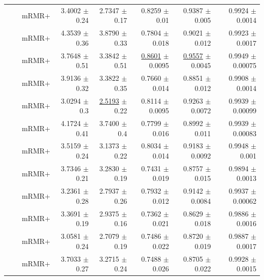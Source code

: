 \begin{longtable}{llp{}rrrrr}
 &  & mRMR+ & 3.4002 {\scriptsize $\pm$ 0.24} & 2.7347 {\scriptsize $\pm$ 0.17} & 0.8259 {\scriptsize $\pm$ 0.01} & 0.9387 {\scriptsize $\pm$ 0.005} & 0.9924 {\scriptsize $\pm$ 0.0014} \\
 &  & mRMR+ & 4.3539 {\scriptsize $\pm$ 0.36} & 3.8790 {\scriptsize $\pm$ 0.33} & 0.7804 {\scriptsize $\pm$ 0.018} & 0.9021 {\scriptsize $\pm$ 0.012} & 0.9923 {\scriptsize $\pm$ 0.0017} \\
 &  & mRMR+ & 3.7648 {\scriptsize $\pm$ 0.51} & 3.3842 {\scriptsize $\pm$ 0.51} & \underline{0.8601} {\scriptsize $\pm$ 0.0095} & \underline{0.9557} {\scriptsize $\pm$ 0.0045} & 0.9949 {\scriptsize $\pm$ 0.00075} \\
 &  & mRMR+ & 3.9136 {\scriptsize $\pm$ 0.32} & 3.3822 {\scriptsize $\pm$ 0.35} & 0.7660 {\scriptsize $\pm$ 0.014} & 0.8851 {\scriptsize $\pm$ 0.012} & 0.9908 {\scriptsize $\pm$ 0.0014} \\
 &  & mRMR+ & 3.0294 {\scriptsize $\pm$ 0.3} & \underline{2.5193} {\scriptsize $\pm$ 0.22} & 0.8114 {\scriptsize $\pm$ 0.0095} & 0.9263 {\scriptsize $\pm$ 0.0072} & 0.9939 {\scriptsize $\pm$ 0.00099} \\
 &  & mRMR+ & 4.1724 {\scriptsize $\pm$ 0.41} & 3.7400 {\scriptsize $\pm$ 0.4} & 0.7799 {\scriptsize $\pm$ 0.016} & 0.8992 {\scriptsize $\pm$ 0.011} & 0.9939 {\scriptsize $\pm$ 0.00083} \\
 &  & mRMR+ & 3.5159 {\scriptsize $\pm$ 0.24} & 3.1373 {\scriptsize $\pm$ 0.22} & 0.8034 {\scriptsize $\pm$ 0.014} & 0.9183 {\scriptsize $\pm$ 0.0092} & 0.9948 {\scriptsize $\pm$ 0.001} \\
 &  & mRMR+ & 3.7346 {\scriptsize $\pm$ 0.21} & 3.2830 {\scriptsize $\pm$ 0.19} & 0.7431 {\scriptsize $\pm$ 0.019} & 0.8757 {\scriptsize $\pm$ 0.015} & 0.9894 {\scriptsize $\pm$ 0.0013} \\
 &  & mRMR+ & 3.2361 {\scriptsize $\pm$ 0.28} & 2.7937 {\scriptsize $\pm$ 0.26} & 0.7932 {\scriptsize $\pm$ 0.012} & 0.9142 {\scriptsize $\pm$ 0.0084} & 0.9937 {\scriptsize $\pm$ 0.00062} \\
 &  & mRMR+ & 3.3691 {\scriptsize $\pm$ 0.19} & 2.9375 {\scriptsize $\pm$ 0.16} & 0.7362 {\scriptsize $\pm$ 0.021} & 0.8629 {\scriptsize $\pm$ 0.018} & 0.9886 {\scriptsize $\pm$ 0.0016} \\
 &  & mRMR+ & 3.0581 {\scriptsize $\pm$ 0.24} & 2.7079 {\scriptsize $\pm$ 0.19} & 0.7486 {\scriptsize $\pm$ 0.022} & 0.8720 {\scriptsize $\pm$ 0.019} & 0.9887 {\scriptsize $\pm$ 0.0017} \\
 &  & mRMR+ & 3.7033 {\scriptsize $\pm$ 0.27} & 3.2715 {\scriptsize $\pm$ 0.24} & 0.7488 {\scriptsize $\pm$ 0.026} & 0.8705 {\scriptsize $\pm$ 0.022} & 0.9928 {\scriptsize $\pm$ 0.0015} \\

\end{longtable}
